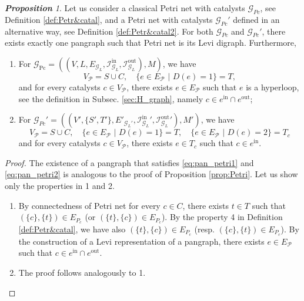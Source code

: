 \documentclass[a4paper,12pt]{article}
\theoremstyle{definition}
\theoremstyle{remark}
\newcommand{\mG}{\mathcal{G}}
\newcommand{\mP}{\mathcal{P}}
\newcommand{\tin}{\mathrm{in}}
\newcommand{\out}{\mathrm{out}}
\newcommand{\inci}{\mathcal{I}^{\tin}}
\newcommand{\inco}{\mathcal{I}^{\out}}
\newtheorem{prop}{\small\bf Proposition}
\begin{document}
\begin{prop}\label{prop:Petri&catal}
Let us consider a classical Petri net with catalysts $\mG_{Pc}$, see Definition \ref{def:Petr&catal}, and a Petri net with catalysts $\mG_{Pc}'$ defined in an alternative way, see Definition \ref{def:Petr&catal2}. For both $\mG_{Pc}$ and $\mG_{Pc}'$, there exists exactly one pangraph such that Petri net is its Levi digraph. Furthermore,
\begin{enumerate}
\item For $\mathcal{G}_{\textrm{Pc}}=((V,L,E_{\mathcal{G}_L}, \inci_{\mG_L},\inco_{\mG_L}),M)$, we have 
\begin{equation}\label{eq:pan_petri1}
V_{\mP}=S\cup C,\quad \{e\in E_{\mP}\,\,|\,\,D(e)=1\}=T,
\end{equation}
and for every catalysts $c\in V_\mP$, there exists $e\in E_{\mP}$ such that $e$ is a hyperloop, see the definition in Subsec. \ref{sec:H_graph}, namely $c\in e^{\textrm{in}}\cap e^{\textrm{out}}$;
\item For $\mG_{Pc}'=((V',\{S',T'\},E'_{\mathcal{G}_L'},  {\inci_{\mG_L}}',{\inco_{\mG_L}}'),M')$, we have 
\begin{equation}\label{eq:pan_petri2}
V_{\mP}=S\cup C,\quad \{e\in E_{\mP}\,\,|\,\,D(e)=1\}=T,\quad \{e\in E_{\mP}\,\,|\,\,D(e)=2\}=T_c
\end{equation}
and for every catalysts $c\in V_\mP$, there exists $e\in T_c$ such that $c\in e^{\textrm{in}}$.
\end{enumerate}
\end{prop}

\begin{proof} The existence of a pangraph that satisfies \eqref{eq:pan_petri1} and \eqref{eq:pan_petri2} is analogous to the proof of Proposition \ref{prop:Petri}. Let us show only the properties in 1 and 2. 
\begin{enumerate}
\item By connectedness of Petri net for every $c\in C$, there exists $t\in T$ such that $(\{c\},\{t\})\in E_{P_c}$ (or $(\{t\},\{c\})\in E_{P_c}$). By the property 4 in Definition \ref{def:Petr&catal}, we have also $(\{t\},\{c\})\in E_{P_c}$ (resp. $(\{c\},\{t\})\in E_{P_c}$). By the construction of a Levi representation of a pangraph, there exists $e\in E_{\mP}$ such that $c\in e^{\textrm{in}}\cap e^{\textrm{out}}$. 
\item The proof follows analogously to 1.
\end{enumerate}
\end{proof}
\end{document}
